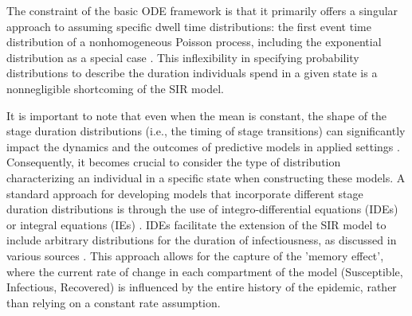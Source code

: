 \documentclass[12pt]{article}
\begin{document}
The constraint of the basic ODE framework is that it primarily offers a singular approach to assuming specific dwell time distributions: the first event time distribution of a nonhomogeneous Poisson process, including the exponential distribution as a special case \cite{hurtado2019generalizations}. This inflexibility in specifying probability distributions to describe the duration individuals spend in a given state is a nonnegligible shortcoming of the SIR model.

It is important to note that even when the mean is constant, the shape of the stage duration distributions (i.e., the timing of stage transitions) can significantly impact the dynamics and the outcomes of predictive models in applied settings \cite{krylova2013effects}\cite{keeling2002understanding}\cite{wearing2005appropriate}\cite{nguyen2008noise}. Consequently, it becomes crucial to consider the type of distribution characterizing an individual in a specific state when constructing these models. A standard approach for developing models that incorporate different stage duration distributions is through the use of integro-differential equations (IDEs) or integral equations (IEs) \cite{hurtado2019generalizations}\cite{kermack1927contribution}\cite{hethcote1980integral}. IDEs facilitate the extension of the SIR model to include arbitrary distributions for the duration of infectiousness, as discussed in various sources \cite{feng2000endemic}\cite{hethcote1980integral}\cite{ma2006generality}. This approach allows for the capture of the 'memory effect', where the current rate of change in each compartment of the model (Susceptible, Infectious, Recovered) is influenced by the entire history of the epidemic, rather than relying on a constant rate assumption.
\end{document}
